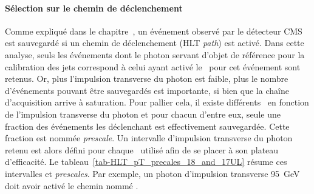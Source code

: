 \paragraph{Sélection sur le chemin de déclenchement}
Comme expliqué dans le chapitre~, un événement observé par le détecteur CMS est sauvegardé si un chemin de déclenchement (HLT \emph{path}) est activé.
Dans cette analyse, seuls les événements dont le photon servant d'objet de référence pour la calibration des jets correspond à celui ayant activé le \HLTpath\ pour cet événement sont retenus.
Or, plus l'impulsion transverse du photon est faible, plus le nombre d'événements pouvant être sauvegardés est importante, si bien que la chaîne d'acquisition arrive à saturation.
Pour pallier cela, il existe différents \HLTpaths\ en fonction de l'impulsion transverse du photon et pour chacun d'entre eux, seule une fraction des événements les déclenchant est effectivement sauvegardée.
Cette fraction est nommée \emph{prescale}.
Un intervalle d'impulsion transverse du photon retenu est alors défini pour chaque \HLTpath\ utilisé afin de se placer à son plateau d'efficacité.
Le tableau~\ref{tab-HLT_pT_precales_18_and_17UL} résume ces intervalles et \emph{prescales}.
Par exemple, un photon d'impulsion transverse \SI{95}{\GeV} doit avoir activé le chemin nommé .
